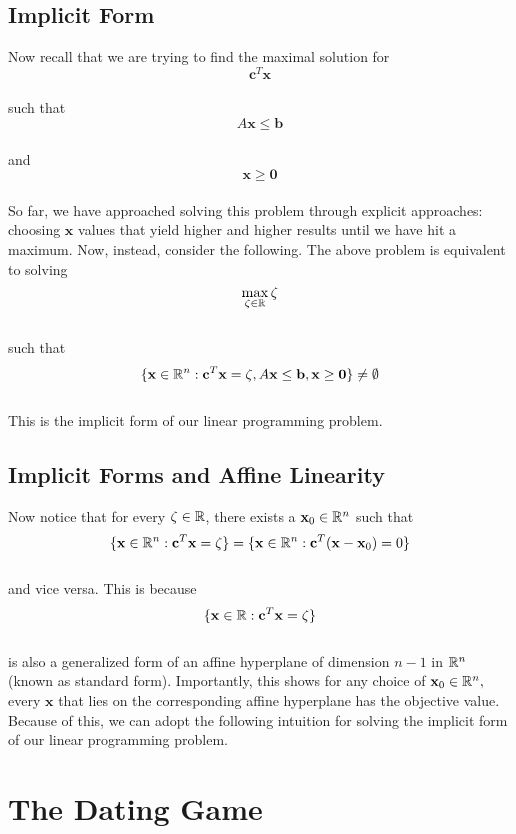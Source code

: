 \documentclass[conference]{IEEEtran}
\numberwithin{equation}{section}
\numberwithin{figure}{section}
\theoremstyle{plain}
\theoremstyle{definition}
\newcommand{\R}{\ensuremath \mathbb{R}}
\newcommand{\1}{\ensuremath \mathbbm{1}}
\begin{document}
\subsection{Implicit Form}
Now recall that we are trying to find the maximal solution for \\
\[\mathbf{c}^T\mathbf{x}\] \\
such that \\
\[A\mathbf{x} \leq \mathbf{b}\] \\
and \\
\[\mathbf{x} \geq \mathbf{0}\] \\
So far, we have approached solving this problem through explicit approaches: 
choosing $\mathbf{x}$ values that yield higher and higher results until we have 
hit a maximum. Now, instead, consider the following. The above problem is 
equivalent to solving \\
\[\max_{\zeta \in \R}\zeta\] \\
such that \\
\[\{\mathbf{x} \in \R^n : \mathbf{c}^T\mathbf{x} = \zeta, A\mathbf{x} \leq 
\mathbf{b}, \mathbf{x} \geq \mathbf{0}\} \neq \emptyset\] \\
This is the implicit form of our linear programming problem. \\

\subsection{Implicit Forms and Affine Linearity}
Now notice that for every $\zeta \in \R$, there exists a $\mathbf{x}_0 \in \R^n$ 
such that \\
\[\{\mathbf{x} \in \R^n : \mathbf{c}^T\mathbf{x} = \zeta\} = \{\mathbf{x} \in 
\R^n : \mathbf{c}^T(\mathbf{x} - \mathbf{x}_0) = 0\}\] \\
and vice versa. This is because \\
\[\{\mathbf{x} \in \R : \mathbf{c}^T\mathbf{x} = \zeta\}\] \\
is also a generalized form of an affine hyperplane of dimension $n-1$ in $\R^n$ 
(known as standard form). Importantly, this shows for any choice of $\mathbf{x}_0 
\in \R^n,$ every $\mathbf{x}$ that lies on the corresponding affine hyperplane 
has the objective value. Because of this, we can adopt the following intuition 
for solving the implicit form of our linear programming problem. \\

\section{The Dating Game}
\end{document}
